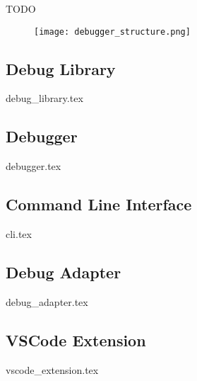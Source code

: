  

TODO

\begin{figure}[h]
    \centering
    \texttt{[image: debugger\_structure.png]}
    \label{fig:EDBStruct}
\end{figure}

\subsection{Debug Library}
{debug_library.tex}

\subsection{Debugger}
{debugger.tex}

\subsection{Command Line Interface}
{cli.tex}

\subsection{Debug Adapter}
{debug_adapter.tex}

\subsection{VSCode Extension}
{vscode_extension.tex}

